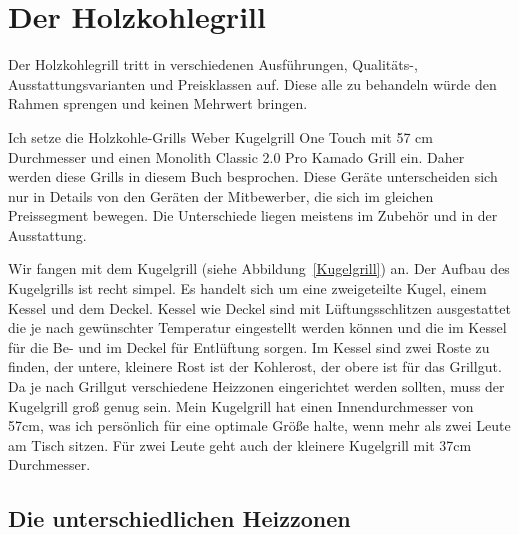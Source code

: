 
\section{Der Holzkohlegrill}

	Der Holzkohlegrill tritt in verschiedenen Ausführungen, Qualitäts-, 
	Ausstattungsvarianten und Preisklassen auf. 
	Diese alle zu behandeln würde den Rahmen sprengen und keinen Mehrwert 
	bringen.
	
	Ich setze die Holzkohle-Grills Weber Kugelgrill One Touch mit 57 cm 
	Durchmesser und einen Monolith Classic 2.0
	Pro Kamado Grill ein. Daher werden diese Grills in diesem Buch besprochen.
	Diese Geräte unterscheiden sich nur in Details von den Geräten der 
	Mitbewerber, die sich im gleichen Preissegment
	bewegen.  Die Unterschiede liegen meistens im Zubehör und in der 
	Ausstattung.
	
	Wir fangen mit dem Kugelgrill (siehe Abbildung~\vref{Kugelgrill}) an. Der Aufbau des Kugelgrills ist recht simpel. 
	Es handelt sich um eine zweigeteilte
	Kugel, einem Kessel und dem Deckel. Kessel wie Deckel sind mit 
	Lüftungsschlitzen ausgestattet die je 
	nach gewünschter Temperatur eingestellt werden können und die im  Kessel 
	für die Be- und im Deckel für 
	Entlüftung sorgen. Im Kessel sind zwei Roste zu finden, der untere, kleinere 
	Rost ist der Kohlerost, der 
	obere ist für das Grillgut. Da je nach Grillgut verschiedene Heizzonen 
	eingerichtet werden sollten, muss der
	Kugelgrill groß genug sein. Mein Kugelgrill hat einen Innendurchmesser von 
	57cm, was ich persönlich für 
	eine optimale Größe halte, wenn mehr als zwei Leute am Tisch sitzen. Für zwei 
	Leute geht auch der kleinere 
	Kugelgrill mit 37cm Durchmesser.

\subsection{Die unterschiedlichen Heizzonen} \label{Heizzonen}
	
